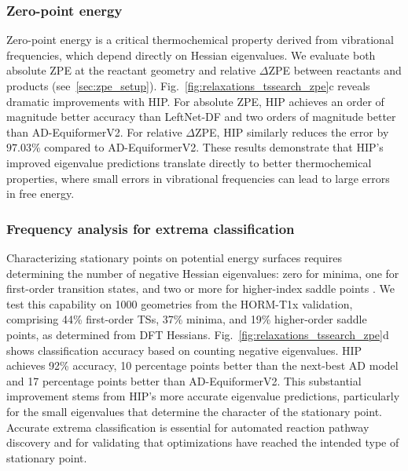 \documentclass[pdflatex,sn-mathphys-num]{sn-jnl}%
\theoremstyle{thmstyleone}%
\theoremstyle{thmstyletwo}%
\theoremstyle{thmstylethree}%
\begin{document}
\subsubsection{Zero-point energy}
Zero-point energy is a critical thermochemical property derived from vibrational frequencies, which depend directly on Hessian eigenvalues. We evaluate both absolute ZPE at the reactant geometry and relative $\Delta$ZPE between reactants and products (see~\ref{sec:zpe_setup}).
Fig.~\ref{fig:relaxations_tssearch_zpe}c reveals dramatic improvements with HIP. For absolute ZPE, HIP achieves an order of magnitude better accuracy than LeftNet-DF and two orders of magnitude better than AD-EquiformerV2. For relative $\Delta$ZPE, HIP similarly reduces the error by $97.03\%$ compared to AD-EquiformerV2.
These results demonstrate that HIP's improved eigenvalue predictions translate directly to better thermochemical properties, where small errors in vibrational frequencies can lead to large errors in free energy.



\subsubsection{Frequency analysis for extrema classification}
Characterizing stationary points on potential energy surfaces requires determining the number of negative Hessian eigenvalues: zero for minima, one for first-order transition states, and two or more for higher-index saddle points \cite{maronsson2012method}. We test this capability on 1000 geometries from the HORM-T1x validation, comprising 44\% first-order TSs, 37\% minima, and 19\% higher-order saddle points, as determined from DFT Hessians.
Fig.~\ref{fig:relaxations_tssearch_zpe}d shows classification accuracy based on counting negative eigenvalues. HIP achieves 92\% accuracy, 10 percentage points better than the next-best AD model and 17 percentage points better than AD-EquiformerV2. This substantial improvement stems from HIP's more accurate eigenvalue predictions, particularly for the small eigenvalues that determine the character of the stationary point.
Accurate extrema classification is essential for automated reaction pathway discovery and for validating that optimizations have reached the intended type of stationary point.
\end{document}
